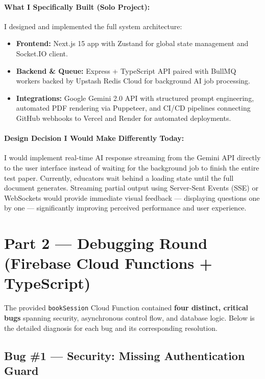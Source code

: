 \documentclass[11pt, a4paper]{article}
\begin{document}
\paragraph{What I Specifically Built (Solo Project):}
I designed and implemented the full system architecture:
\begin{itemize}[nosep]
  \item \textbf{Frontend:} Next.js 15 app with Zustand for global state management and Socket.IO client.
  \item \textbf{Backend \& Queue:} Express + TypeScript API paired with BullMQ workers backed by Upstash Redis Cloud for background AI job processing.
  \item \textbf{Integrations:} Google Gemini 2.0 API with structured prompt engineering, automated PDF rendering via Puppeteer, and CI/CD pipelines connecting GitHub webhooks to Vercel and Render for automated deployments.
\end{itemize}

\paragraph{Design Decision I Would Make Differently Today:}
I would implement real-time AI response streaming from the Gemini API directly to the user interface instead of waiting for the background job to finish the entire test paper. Currently, educators wait behind a loading state until the full document generates. Streaming partial output using Server-Sent Events (SSE) or WebSockets would provide immediate visual feedback --- displaying questions one by one --- significantly improving perceived performance and user experience.

\newpage

\section{Part 2 --- Debugging Round (Firebase Cloud Functions + TypeScript)}

The provided \texttt{bookSession} Cloud Function contained \textbf{four distinct, critical bugs} spanning security, asynchronous control flow, and database logic. Below is the detailed diagnosis for each bug and its corresponding resolution.

\bigskip

\subsection{Bug \#1 --- Security: Missing Authentication Guard}
\end{document}
